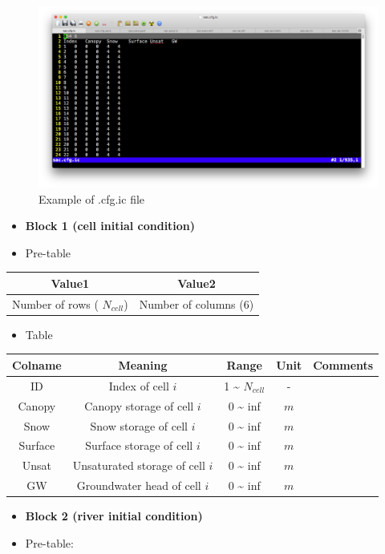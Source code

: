 \documentclass[
]{scrbook}
\providecommand{\tightlist}{%
  \setlength{\itemsep}{0pt}\setlength{\parskip}{0pt}}
\begin{document}
\begin{figure}
\centering
\includegraphics{Fig/IO/cfg.ic.png}
\caption{Example of .cfg.ic file}
\end{figure}

\begin{itemize}
\item
  \textbf{Block 1 (cell initial condition)}
\item
  Pre-table
\end{itemize}

\begin{longtable}[]{@{}cc@{}}
\toprule
Value1 & Value2\tabularnewline
\midrule
\endhead
Number of rows ( \(N_{cell}\)) & Number of columns (\(6\))\tabularnewline
\bottomrule
\end{longtable}

\begin{itemize}
\tightlist
\item
  Table
\end{itemize}

\begin{longtable}[]{@{}ccccc@{}}
\toprule
Colname & Meaning & Range & Unit & Comments\tabularnewline
\midrule
\endhead
ID & Index of cell \(i\) & 1 \textasciitilde{} \(N_{cell}\) & - &\tabularnewline
Canopy & Canopy storage of cell \(i\) & 0 \textasciitilde{} inf & \(m\) &\tabularnewline
Snow & Snow storage of cell \(i\) & 0 \textasciitilde{} inf & \(m\) &\tabularnewline
Surface & Surface storage of cell \(i\) & 0 \textasciitilde{} inf & \(m\) &\tabularnewline
Unsat & Unsaturated storage of cell \(i\) & 0 \textasciitilde{} inf & \(m\) &\tabularnewline
GW & Groundwater head of cell \(i\) & 0 \textasciitilde{} inf & \(m\) &\tabularnewline
\bottomrule
\end{longtable}

\begin{itemize}
\item
  \textbf{Block 2 (river initial condition)}
\item
  Pre-table:
\end{itemize}
\end{document}
